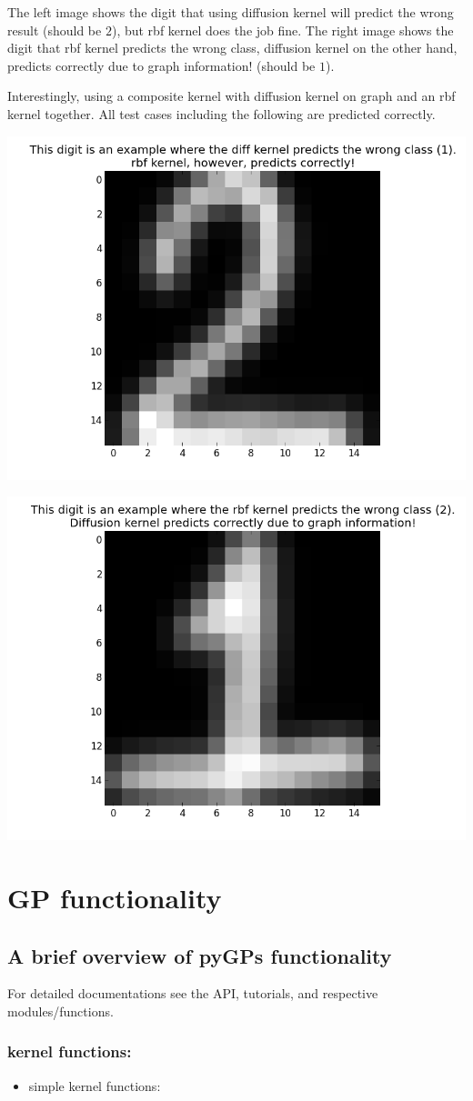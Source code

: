 \documentclass[letterpaper,10pt,english]{sphinxmanual}
\begin{document}
The left image shows the digit that using diffusion kernel will predict the wrong result (should be $2$),
but rbf kernel does the job fine. The right image shows the digit that rbf kernel predicts the wrong class, diffusion kernel on the other hand, predicts correctly due to graph information! (should be $1$).

Interestingly, using a composite kernel with diffusion kernel on graph and an rbf kernel together. All test cases including the following are predicted correctly.

\includegraphics[width=0.500\linewidth]{_images/digitDiffwrong.png}

\includegraphics[width=0.500\linewidth]{_images/digitRBFwrong.png}


\section{GP functionality}
\label{index:gp-functionality}

\subsection{A brief overview of pyGPs functionality}
\label{functionality:a-brief-overview-of-pygps-functionality}\label{functionality::doc}
For detailed documentations see the API, tutorials, and respective modules/functions.


\subsubsection{kernel functions:}
\label{functionality:kernel-functions}\begin{itemize}
\item {} 
simple kernel functions:

\end{itemize}
\end{document}
